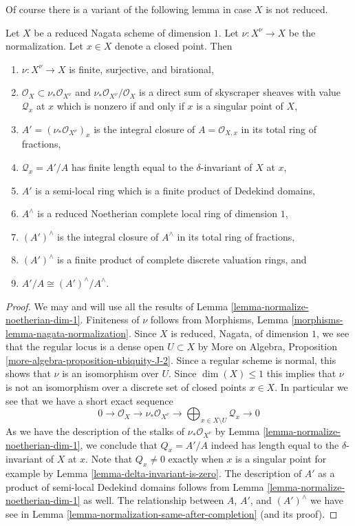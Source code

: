\noindent
Of course there is a variant of the following lemma in case
$X$ is not reduced.

\begin{lemma}
\label{lemma-prepare-delta-invariant}
Let $X$ be a reduced Nagata scheme of dimension $1$. Let $\nu : X^\nu \to X$
be the normalization. Let $x \in X$ denote a closed point. Then
\begin{enumerate}
\item $\nu : X^\nu \to X$ is finite, surjective, and birational,
\item $\mathcal{O}_X \subset \nu_*\mathcal{O}_{X^\nu}$ and
$\nu_*\mathcal{O}_{X^\nu}/\mathcal{O}_X$ is a direct sum of
skyscraper sheaves with value $\mathcal{Q}_x$ at $x$ which is nonzero
if and only if $x$ is a singular point of $X$,
\item $A' = (\nu_*\mathcal{O}_{X^\nu})_x$ is the integral closure
of $A = \mathcal{O}_{X, x}$ in its total ring of fractions,
\item $\mathcal{Q}_x = A'/A$ has finite length equal to the
$\delta$-invariant of $X$ at $x$,
\item $A'$ is a semi-local ring which is a finite product of
Dedekind domains,
\item $A^\wedge$ is a reduced Noetherian complete
local ring of dimension $1$,
\item $(A')^\wedge$ is the integral closure of $A^\wedge$
in its total ring of fractions,
\item $(A')^\wedge$ is a finite product of
complete discrete valuation rings, and
\item $A'/A \cong (A')^\wedge/A^\wedge$.
\end{enumerate}
\end{lemma}

\begin{proof}
We may and will use all the results of
Lemma \ref{lemma-normalize-noetherian-dim-1}.
Finiteness of $\nu$ follows from
Morphisms, Lemma \ref{morphisms-lemma-nagata-normalization}.
Since $X$ is reduced, Nagata, of dimension $1$, we see that the
regular locus is a dense open $U \subset X$ by
More on Algebra, Proposition \ref{more-algebra-proposition-ubiquity-J-2}.
Since a regular scheme is normal, this shows that $\nu$
is an isomorphism over $U$.
Since $\dim(X) \leq 1$ this implies that $\nu$ is not an isomorphism
over a discrete set of closed points $x \in X$.
In particular we see that we have a short exact sequence
$$
0 \to \mathcal{O}_X \to \nu_*\mathcal{O}_{X^\nu} \to
\bigoplus\nolimits_{x \in X \setminus U} \mathcal{Q}_x \to 0
$$
As we have the description of the stalks of $\nu_*\mathcal{O}_{X^\nu}$
by Lemma \ref{lemma-normalize-noetherian-dim-1}, we conclude that
$Q_x = A'/A$ indeed has length equal to the $\delta$-invariant of $X$ at $x$.
Note that $Q_x \not = 0$ exactly when $x$ is a singular point for
example by Lemma \ref{lemma-delta-invariant-is-zero}.
The description of $A'$ as a product of semi-local Dedekind domains follows
from Lemma \ref{lemma-normalize-noetherian-dim-1} as well.
The relationship between $A$, $A'$, and $(A')^\wedge$
we have see in Lemma \ref{lemma-normalization-same-after-completion}
(and its proof).
\end{proof}




